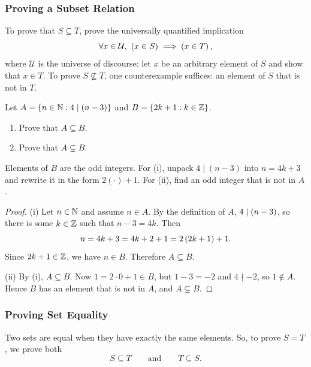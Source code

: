 \subsubsection{Proving a Subset Relation}
To prove that $S \subseteq T$, prove the universally quantified implication
\begin{equation*}
    \forall x \in \mathcal{U},\ \left(x \in S\right) \implies \left(x \in T\right),
\end{equation*}
where $\mathcal{U}$ is the universe of discourse: let $x$ be an arbitrary
element of $S$ and show that $x\in T$. To prove $S \nsubseteq T$, one
counterexample suffices: an element of $S$ that is not in $T$.

\begin{example}
    Let $A = \left\{n \in \mathbb{N} : 4 \mid (n - 3)\right\}$ and
    $B = \left\{2k + 1 : k \in \mathbb{Z}\right\}$.
    \begin{enumerate}[label=(\roman*)]
        \item Prove that $A \subseteq B$.
        \item Prove that $A \subsetneq B$.
    \end{enumerate}
\end{example}
\begin{remark}
    Elements of $B$ are the odd integers. For (i), unpack $4\mid(n-3)$ into
    $n=4k+3$ and rewrite it in the form $2(\cdot)+1$. For (ii), find an odd
    integer that is not in $A$.
\end{remark}
\begin{proof}
    (i) Let $n \in \mathbb{N}$ and assume $n \in A$. By the definition of $A$,
    $4 \mid \left(n - 3\right)$, so there is some $k \in \mathbb{Z}$ such that
    $n - 3 = 4k$. Then
    \begin{equation*}
        n = 4k + 3 = 4k + 2 + 1 = 2\left(2k + 1\right) + 1.
    \end{equation*}
    Since $2k + 1 \in \mathbb{Z}$, we have $n \in B$. Therefore $A \subseteq B$.

    (ii) By (i), $A\subseteq B$. Now $1 = 2\cdot 0 + 1 \in B$, but
    $1 - 3 = -2$ and $4 \nmid -2$, so $1 \notin A$. Hence $B$ has an element
    that is not in $A$, and $A \subsetneq B$.
\end{proof}

\subsubsection{Proving Set Equality}
Two sets are equal when they have exactly the same elements. So, to prove
$S = T$, we prove both
\begin{equation*}
    S \subseteq T \qquad\text{and}\qquad T \subseteq S.
\end{equation*}


